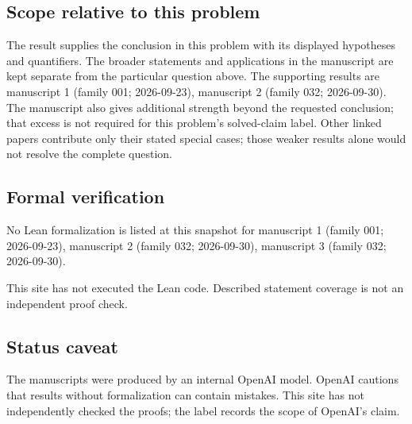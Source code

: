 \documentclass[11pt]{article}
\begin{document}
\subsection{Scope relative to this problem}
The result supplies the conclusion in this problem with its displayed hypotheses and quantifiers. The broader statements and applications in the manuscript are kept separate from the particular question above. The supporting results are manuscript 1 (family 001; 2026-09-23), manuscript 2 (family 032; 2026-09-30). The manuscript also gives additional strength beyond the requested conclusion; that excess is not required for this problem's solved-claim label. Other linked papers contribute only their stated special cases; those weaker results alone would not resolve the complete question.

\subsection{Formal verification}
No Lean formalization is listed at this snapshot for manuscript 1 (family 001; 2026-09-23), manuscript 2 (family 032; 2026-09-30), manuscript 3 (family 032; 2026-09-30).

This site has not executed the Lean code. Described statement coverage is not an independent proof check.

\subsection{Status caveat}
The manuscripts were produced by an internal OpenAI model. OpenAI cautions that results without formalization can contain mistakes. This site has not independently checked the proofs; the label records the scope of OpenAI's claim.
\end{document}
